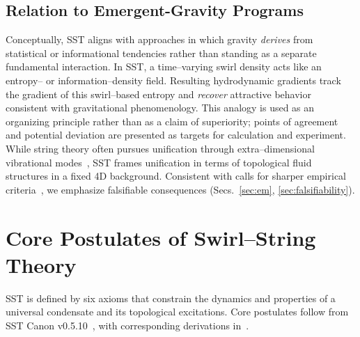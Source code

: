 \documentclass[10pt,reprint,aps,onecolumn,nofootinbib]{revtex4-2}
\begin{document}
    \subsection*{Relation to Emergent-Gravity Programs}
        Conceptually, SST aligns with approaches in which gravity \emph{derives} from statistical or informational tendencies rather than standing as a separate fundamental interaction. In SST, a time–varying swirl density acts like an entropy– or information–density field. Resulting hydrodynamic gradients track the gradient of this swirl–based entropy and \emph{recover} attractive behavior consistent with gravitational phenomenology. This analogy is used as an organizing principle rather than as a claim of superiority; points of agreement and potential deviation are presented as targets for calculation and experiment. While string theory often pursues unification through extra–dimensional vibrational modes~\cite{Susskind2003}, SST frames unification in terms of topological fluid structures in a fixed 4D background. Consistent with calls for sharper empirical criteria~\cite{Hossenfelder2018}, we emphasize falsifiable consequences (Secs.~\ref{sec:em}, \ref{sec:falsifiability}).


\section{Core Postulates of Swirl–String Theory}\label{sec:postulates}
    SST is defined by six axioms that constrain the dynamics and properties of a universal condensate and its topological excitations. Core postulates follow from SST Canon v0.5.10~\cite{sstCanon}, with corresponding derivations in~\cite{sstLagrangian}.
\end{document}
